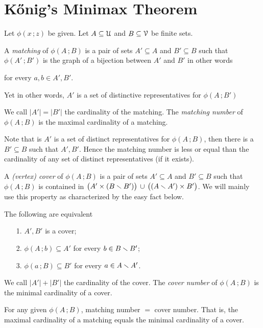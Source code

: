\documentclass[scombinatorics.tex]{subfiles}
\begin{document}
\section{K\H{o}nig's Minimax Theorem}\label{Konig}

Let $\phi(x\,;z)$ be given. 
Let $A\subseteq\EuScript U$ and $B\subseteq\EuScript V$ be finite sets. 

A \emph{matching\/} of $\phi(A\,;B)$ is a pair of sets $A'\subseteq A$  and $B'\subseteq B$ such that $\phi(A'\,;B')$ is the graph of a bijection between $A'$ and $B'$ in other words

\quad for every $a,b\in A',B'$.

Yet in other words, $A'$ is a set of distinctive representatives for  $\phi(A\,;B')$

We call $|A'|=|B'|$ the cardinality of the matching.
The \emph{matching number} of $\phi(A\,;B)$ is the maximal cardinality of a matching.

Note that is $A'$ is a set of distinct representatives for $\phi(A\,;B)$, then there is a $B'\subseteq B$ such that $A',B'$.
Hence the matching number is less or equal than the cardinality of any set of distinct representatives (if it exists).

A \emph{(vertex) cover\/} of $\phi(A\,;B)$ is a pair of sets $A'\subseteq A$ and $B'\subseteq B$ such that $\phi(A\,;B)$ is contained in $\big(A'\times (B\smallsetminus B')\big)\,\cup\, \big((A\smallsetminus A')\times B'\big)$. We will mainly use this property as characterized by the easy fact below.

\begin{fact}\label{fact_cover}
   The following are equivalent
   \begin{itemize}
      \item[1.] $A',B'$ is a cover;
      \item[2.] $\phi(A\,;b)\subseteq A'$ for every $b\in B\smallsetminus B'$;
      \item[3.] $\phi(a\,;B)\subseteq B'$ for every $a\in A\smallsetminus A'$.\QED
   \end{itemize}
\end{fact}

We call $|A'|+|B'|$ the cardinality of the cover.
The \emph{cover number\/} of $\phi(A\,;B)$ is the minimal cardinality of a cover.


\begin{void_thm}
   For any given  $\phi(A\,;B)$, matching number $=$ cover number.
   That is, the maximal cardinality of a matching equals the minimal cardinality of a cover.
\end{void_thm}
\end{document}
